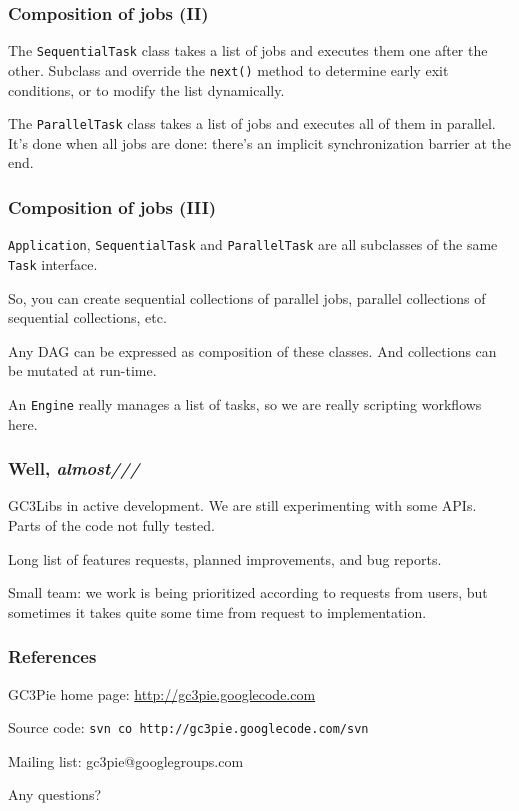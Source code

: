 \documentclass[presentation]{beamer}
\begin{document}
\begin{frame}
\frametitle{Composition of jobs (II)}
\label{sec-26}

  The \texttt{SequentialTask} class takes a list of jobs and executes them
  one after the other. Subclass and override the \texttt{next()} method to
  determine early exit conditions, or to modify the list dynamically.

  The \texttt{ParallelTask} class takes a list of jobs and executes all of
  them in parallel.  It's done when all jobs are done: there's an
  implicit synchronization barrier at the end.
  
\end{frame}
\begin{frame}
\frametitle{Composition of jobs (III)}
\label{sec-27}

  \texttt{Application}, \texttt{SequentialTask} and \texttt{ParallelTask} are all
  subclasses of the same \texttt{Task} interface.

  So, you can create sequential collections of parallel jobs, parallel
  collections of sequential collections, etc.

  Any DAG can be expressed as composition of these classes.
  And collections can be mutated at run-time.

  An \texttt{Engine} really manages a list of tasks, so we are really
  scripting workflows here.
\end{frame}
\begin{frame}
\frametitle{Well, \emph{almost///}}
\label{sec-28}


  GC3Libs in active development.  We are still experimenting with some
  APIs.  Parts of the code not fully tested.

  Long list of features requests, planned improvements, and bug
  reports. 

  Small team: we work is being prioritized according to requests from
  users, but sometimes it takes quite some time from request to
  implementation.
  
\end{frame}
\begin{frame}
\frametitle{References}
\label{sec-29}

\begin{center}
GC3Pie home page: \href{http://gc3pie.googlecode.com}{http://gc3pie.googlecode.com}

Source code: \texttt{svn co http://gc3pie.googlecode.com/svn}

Mailing list: gc3pie@googlegroups.com

Any questions?
\end{center}
\end{frame}
\end{document}

